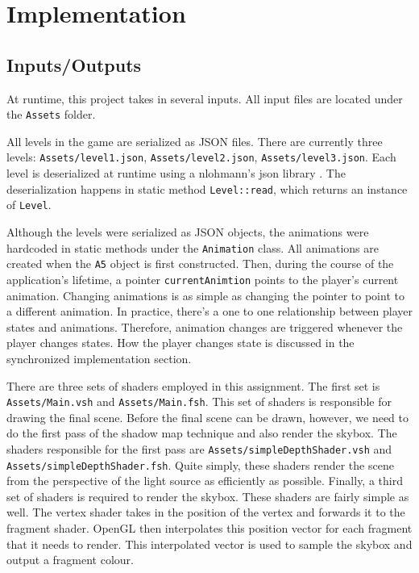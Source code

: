 \documentclass[11pt]{report}
\begin{document}
\chapter{Implementation}
\section{Inputs/Outputs}
At runtime, this project takes in several inputs. All input files are located under the \verb|Assets| folder.

All levels in the game are serialized as JSON files. There are currently three levels: \verb|Assets/level1.json|, \verb|Assets/level2.json|, \verb|Assets/level3.json|. Each level is deserialized at runtime using a nlohmann's json library \cite{nlohmann}. The deserialization happens in static method \verb|Level::read|, which returns an instance of \verb|Level|.

Although the levels were serialized as JSON objects, the animations were hardcoded in static methods under the \verb|Animation| class. All animations are created when the \verb|A5| object is first constructed. Then, during the course of the application's lifetime, a pointer \verb|currentAnimtion| points to the player's current animation. Changing animations is as simple as changing the pointer to point to a different animation. In practice, there's a one to one relationship between player states and animations. Therefore, animation changes are triggered whenever the player changes states. How the player changes state is discussed in the synchronized implementation section.

There are three sets of shaders employed in this assignment. The first set is \verb|Assets/Main.vsh| and \verb|Assets/Main.fsh|. This set of shaders is responsible for drawing the final scene. Before the final scene can be drawn, however, we need to do the first pass of the shadow map technique and also render the skybox. The shaders responsible for the first pass are \verb|Assets/simpleDepthShader.vsh| and \verb|Assets/simpleDepthShader.fsh|. Quite simply, these shaders render the scene from the perspective of the light source as efficiently as possible. Finally, a third set of shaders is required to render the skybox. These shaders are fairly simple as well. The vertex shader takes in the position of the vertex and forwards it to the fragment shader. OpenGL then interpolates this position vector for each fragment that it needs to render. This interpolated vector is used to sample the skybox and output a fragment colour.
\end{document}
